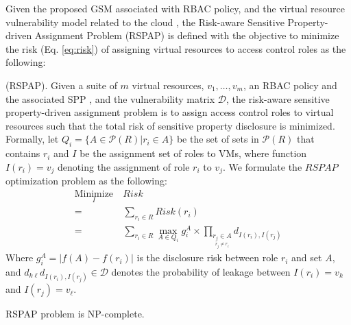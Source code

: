 Given the proposed GSM associated with RBAC policy, and the virtual resource vulnerability model related to the cloud \cite{almutairi2014risk}, the Risk-aware Sensitive Property-driven Assignment Problem (RSPAP) is defined with the objective to minimize the risk (Eq. \ref{eq:risk}) of assigning virtual resources to access control roles as the following:

\begin{definition}\label{def:RSPAP}
(RSPAP). Given a suite of $m$ virtual resources, $v_1, \ldots, v_m$, an RBAC policy and the associated SPP , and the vulnerability matrix $\mathcal{D}$, the risk-aware sensitive property-driven assignment problem is to assign access control roles to virtual resources such that the total risk of sensitive property disclosure is minimized. Formally, let $Q_i = \{ A\in \mathcal{P}(R) | r_i \in A\}$ be the set of sets in $\mathcal{P}(R)$ that contains $r_i$ and $I$ be the assignment set of roles to VMs, where function $I(r_i)=v_j$ denoting the assignment of role $r_i$ to $v_j$. We formulate the $RSPAP$ optimization problem as the following:
\begin{equation}\label{eq:cost}
\begin{split}
\underset{I}{\text{Minimize}} \ & Risk \\ 
= &\sum_{r_i \in R} Risk(r_i) \\
= &\sum_{r_i \in R}  \max_{A \in Q_i} g_i^A \times \prod_{\underset{r_j \neq r_i}{r_j \in A}} d_{I(r_i),I(r_j)} 
\end{split}
\end{equation}
Where $g_i^A = |f(A)-f(r_i)|$ is the disclosure risk between role $r_i$ and set $A$, and $d_{k\ell}d_{I(r_i),I(r_j)} \in \mathcal{D}$ denotes the probability of leakage between $I(r_i)=v_k$ and  $I(r_j)=v_{\ell}$. 
\end{definition} 
\begin{theorem}
RSPAP problem is NP-complete.
\end{theorem} 

